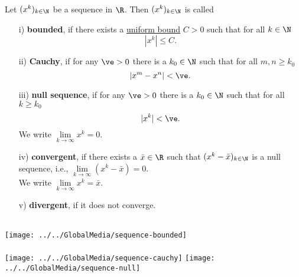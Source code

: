 \begin{frame}
\begin{defi}
Let $(x^k)_{k\in \N}$ be a sequence in $\R$. Then $(x^k)_{k\in \N}$ is called \vspace{0.2cm}\\
\begin{minipage}[t]{0.7\textwidth}
\begin{itemize}	
	\item[i)] \textbf{bounded}, if there exists a \underline{uniform bound} $C>0$ such that for all $k\in \N$
	$$|x^k| \leq C .$$ \vspace{0.2cm}
	\item[ii)] \textbf{Cauchy}, if for any $\ve >0$ there is a $k_0\in\N$ such that for all $m,n \geq k_0$
	$$|x^m-x^n|<\ve.$$ \vspace{0.2cm}
	\item[iii)] \textbf{null sequence}, if for any $\ve >0$ there is a $k_0\in\N$ such that for all $k\geq k_0$
	$$|x^k|<\ve.\vspace{0.2cm}$$ We write $\lim\limits_{k\to\infty}x^k=0$.\vspace{0.2cm}
	\item[iv)]  \textbf{convergent}, if there exists a $\bar{x}\in\R$ such that $ (x^k-\bar{x})_{k \in \N}$ is a null sequence, i.e., $\lim\limits_{k\to\infty}(x^k-\bar{x})=0$.\\ We write $\lim\limits_{k\to\infty}x^k=\bar{x}$.\vspace{0.2cm}
	\item[v)] \textbf{divergent}, if it does not converge.
\end{itemize}
\end{minipage}
\begin{minipage}[t]{0.3\textwidth}
	~\\
 \texttt{[image: ../../GlobalMedia/sequence-bounded]}\\~\\
 \texttt{[image: ../../GlobalMedia/sequence-cauchy]}
 	\texttt{[image: ../../GlobalMedia/sequence-null]}
\end{minipage}

\end{defi}
\end{frame}
%
